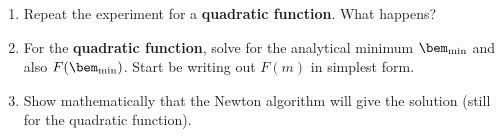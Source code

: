 \documentclass[11pt,titlepage,fleqn]{article}
\renewcommand{\vertgap}{\vspace{1.5cm}}
\begin{document}
\begin{enumerate}
\vertgap

\item Repeat the experiment for a {\bf quadratic function}. What happens?



\item For the {\bf quadratic function}, solve for the analytical minimum $\bem_{\rm min}$ and also $F(\bem_{\rm min})$. Start be writing out $F(m)$ in simplest form.

\vspace{6cm}

\item Show mathematically that the Newton algorithm will give the solution (still for the quadratic function).

\end{enumerate}

%
%

\end{document}
